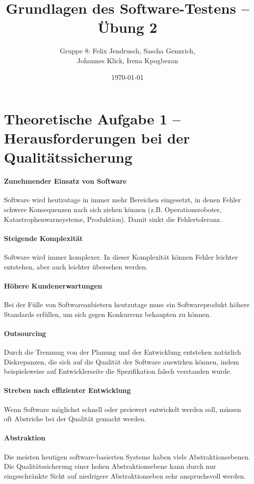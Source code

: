 \documentclass[a4paper, 12pt]{article}
\title{Grundlagen des Software-Testens -- Übung 2}
\author{Gruppe 8: Felix Jendrusch, Sascha Gennrich,\\Johannes Klick, Irena Kpogbezan}
\date{\today}
\begin{document}
\maketitle

\section*{Theoretische Aufgabe 1 -- Herausforderungen bei der Qualitätssicherung}
\paragraph{Zunehmender Einsatz von Software} Software wird heutzutage in immer mehr Bereichen eingesetzt, in denen Fehler schwere Konsequenzen nach sich ziehen können (z.B. Operationsroboter, Katastrophenwarnsysteme, Produktion). Damit sinkt die Fehlertoleranz.
\paragraph{Steigende Komplexität} Software wird immer komplexer. In dieser Komplexität können Fehler leichter entstehen, aber auch leichter übersehen werden.
\paragraph{Höhere Kundenerwartungen} Bei der Fülle von Softwareanbietern heutzutage muss ein Softwareprodukt höhere Standards erfüllen, um sich gegen Konkurrenz behaupten zu können.
\paragraph{Outsourcing} Durch die Trennung von der Planung und der Entwicklung entstehen natürlich Diskrepanzen, die sich auf die Qualität der Software auswirken können, indem beispielsweise auf Entwicklerseite die Spezifikation falsch verstanden wurde.
\paragraph{Streben nach effizienter Entwicklung} Wenn Software möglichst schnell oder preiswert entwickelt werden soll, müssen oft Abstriche bei der Qualität gemacht werden.
\paragraph{Abstraktion} Die meisten heutigen software-basierten Systeme haben viele Abstraktionsebenen. Die Qualitätssicherung einer hohen Abstraktionsebene kann durch nur eingeschränkte Sicht auf niedrigere Abstraktionseben sehr anspruchsvoll werden.
\end{document}
